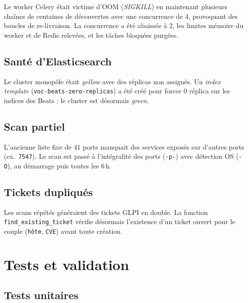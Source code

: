 \documentclass[11pt,a4paper]{article}
\begin{document}
Le worker Celery \'etait victime d'OOM (\emph{SIGKILL}) en maintenant
plusieurs cha\^ines de centaines de d\'ecouvertes avec une concurrence de 4,
provoquant des boucles de re-livraison. La concurrence a \'et\'e abaiss\'ee
\`a 2, les limites m\'emoire du worker et de Redis relev\'ees, et les
t\^aches bloqu\'ees purg\'ees.

\subsection{Sant\'e d'Elasticsearch}

Le cluster monop\^ole \'etait \emph{yellow} avec des r\'eplicas non
assign\'es. Un \emph{index template} (\texttt{voc-beats-zero-replicas}) a
\'et\'e cr\'e\'e pour forcer 0 r\'eplica sur les indices des Beats ; le
cluster est d\'esormais \emph{green}.

\subsection{Scan partiel}

L'ancienne liste fixe de 41 ports manquait des services expos\'es sur
d'autres ports (ex.\ \texttt{7547}). Le scan est pass\'e \`a
l'int\'egralit\'e des ports (\texttt{-p-}) avec d\'etection OS
(\texttt{-O}), au d\'emarrage puis toutes les 6\,h.

\subsection{Tickets dupliqu\'es}

Les scans r\'ep\'et\'es g\'en\'eraient des tickets GLPI en double. La
fonction \texttt{find\_existing\_ticket} v\'erifie d\'esormais l'existence
d'un ticket ouvert pour le couple (\texttt{h\^ote}, \texttt{CVE}) avant toute
cr\'eation.

\clearpage

\section{Tests et validation}

\subsection{Tests unitaires}
\end{document}
